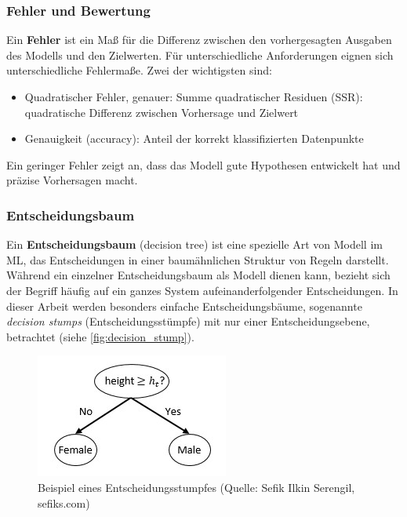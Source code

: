 \subsubsection{Fehler und Bewertung}
Ein \textbf{Fehler} ist ein Maß für die Differenz zwischen den vorhergesagten Ausgaben des Modells und den Zielwerten. Für unterschiedliche Anforderungen eignen sich unterschiedliche Fehlermaße. Zwei der wichtigsten sind:

\begin{itemize}
    \item Quadratischer Fehler, genauer: Summe quadratischer Residuen (SSR): quadratische Differenz zwischen Vorhersage und Zielwert
    \item Genauigkeit (accuracy): Anteil der korrekt klassifizierten Datenpunkte
\end{itemize}
Ein geringer Fehler zeigt an, dass das Modell gute Hypothesen entwickelt hat und präzise Vorhersagen macht.

\subsubsection{Entscheidungsbaum}
Ein \textbf{Entscheidungsbaum} (decision tree) ist eine spezielle Art von Modell im ML, das Entscheidungen in einer baumähnlichen Struktur von Regeln darstellt. Während ein einzelner Entscheidungsbaum als Modell dienen kann, bezieht sich der Begriff häufig auf ein ganzes System aufeinanderfolgender Entscheidungen. In dieser Arbeit werden besonders einfache Entscheidungsbäume, sogenannte \textit{decision stumps} (Entscheidungsstümpfe) mit nur einer Entscheidungsebene, betrachtet (siehe \autoref{fig:decision_stump}).

\begin{figure}[h]
    \centering
    \includegraphics[width=0.5\linewidth]{Images/decision_stump.png}
    \caption[Beispiel eines Entscheidungsstumpfes]{Beispiel eines Entscheidungsstumpfes (Quelle: Sefik Ilkin Serengil, sefiks.com)}
    \label{fig:decision_stump}
\end{figure}

